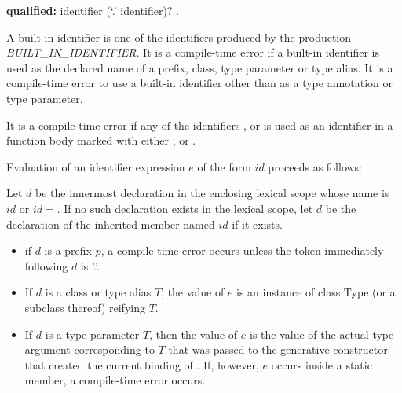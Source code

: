 \documentclass{article}
\newcommand{\code}[1]{{\sf #1}}
\begin{document}
\begin{itemize}
\begin{grammar}
{\bf qualified:}
      identifier (`{\escapegrammar .}' identifier)?
      .
\end{grammar}

\LMHash{}
A built-in identifier is one of the identifiers produced by the production {\em BUILT\_IN\_IDENTIFIER}. It is a compile-time error if a built-in identifier is used as the declared name of a prefix, class, type parameter or type alias. It is a compile-time error to use a built-in identifier other than \DYNAMIC{} as a type annotation or type parameter.


\LMHash{}
It is a compile-time error if any of the identifiers \ASYNC, \AWAIT{} or \YIELD{} is used as an identifier in a function body marked with either \ASYNC{}, \ASYNC* or \SYNC*.


\LMHash{}
Evaluation of an identifier expression $e$ of the form $id$ proceeds as follows:


\LMHash{}
Let $d$ be the innermost declaration in the enclosing lexical scope whose name is $id$ or $id=$.  If no such declaration exists in the lexical scope, let $d$ be the declaration of the inherited member named $id$ if it exists.

\begin{itemize}
\item if $d$ is a prefix $p$, a compile-time error occurs unless the token immediately following $d$ is \code{'.'}.
\item If $d$ is a class or type alias $T$, the value of $e$ is an instance of  class \code{Type} (or a subclass thereof) reifying $T$.
\item If $d$ is a type parameter $T$, then the value of $e$ is the value of the actual type argument corresponding to $T$ that was  passed to the generative constructor that created the current binding of \THIS{}. If, however, $e$ occurs inside a static member, a compile-time error occurs.


\end{itemize}
\end{itemize}
\end{document}
